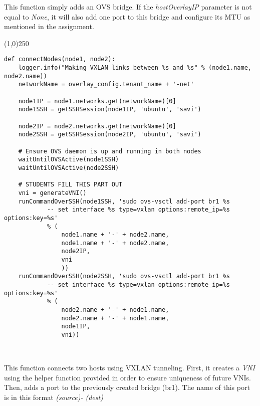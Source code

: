 \documentclass[12pt]{article}
\begin{document}
This function simply adds an OVS bridge. If the \textit{hostOverlayIP} parameter is not equal to \textit{None}, it will also add one port to this bridge and configure its MTU as mentioned in the assignment.

\begin{center}
	\line(1,0){250}
\end{center}
\begin{verbatim}
def connectNodes(node1, node2):
    logger.info("Making VXLAN links between %s and %s" % (node1.name, node2.name))
    networkName = overlay_config.tenant_name + '-net'

    node1IP = node1.networks.get(networkName)[0]
    node1SSH = getSSHSession(node1IP, 'ubuntu', 'savi')

    node2IP = node2.networks.get(networkName)[0]
    node2SSH = getSSHSession(node2IP, 'ubuntu', 'savi')

    # Ensure OVS daemon is up and running in both nodes
    waitUntilOVSActive(node1SSH)
    waitUntilOVSActive(node2SSH)

    # STUDENTS FILL THIS PART OUT
    vni = generateVNI()
    runCommandOverSSH(node1SSH, 'sudo ovs-vsctl add-port br1 %s
            -- set interface %s type=vxlan options:remote_ip=%s options:key=%s'
            % (
                node1.name + '-' + node2.name,
                node1.name + '-' + node2.name,
                node2IP,
                vni
                ))
    runCommandOverSSH(node2SSH, 'sudo ovs-vsctl add-port br1 %s
            -- set interface %s type=vxlan options:remote_ip=%s options:key=%s'
            % (
                node2.name + '-' + node1.name,
                node2.name + '-' + node1.name,
                node1IP,
                vni))



\end{verbatim}

This function connects two hosts using VXLAN tunneling. First, it creates a \textit{VNI} using the helper function provided in order to ensure uniqueness of future VNIs. Then, adds a port to the previously created bridge (br1). The name of this port is in this format \textit{(source)- (dest)}
\end{document}

